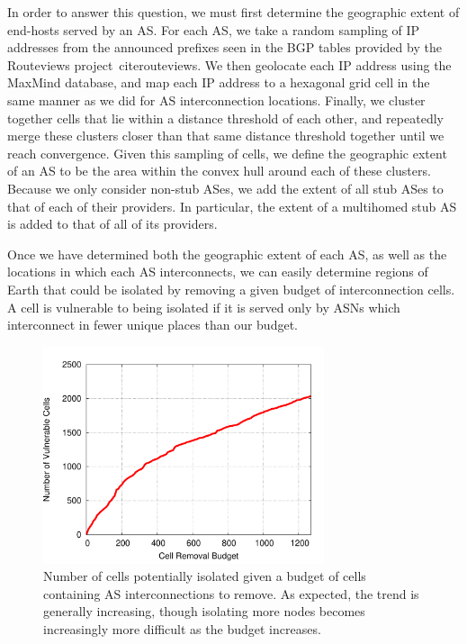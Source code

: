     In order to answer this question, we must first determine the geographic extent of end-hosts served by an AS.
    For each AS, we take a random sampling of IP addresses from the announced prefixes seen in the BGP tables provided by the Routeviews project~cite{routeviews}. 
    We then geolocate each IP address using the MaxMind database, and map each IP address to a hexagonal grid cell in the same manner as we did for AS interconnection locations.
    Finally, we cluster together cells that lie within a distance threshold of each other, and repeatedly merge these clusters closer than that same distance threshold together until we reach convergence.
    Given this sampling of cells, we define the geographic extent of an AS to be the area within the convex hull around each of these clusters. 
    Because we only consider non-stub ASes, we add the extent of all stub ASes to that of each of their providers.
    In particular, the extent of a multihomed stub AS is added to that of all of its providers.

    Once we have determined both the geographic extent of each AS, as well as the locations in which each AS interconnects, we can easily determine regions of Earth that could be isolated by removing a given budget of interconnection cells.
    A cell is vulnerable to being isolated if it is served only by ASNs which interconnect in fewer unique places than our budget.

    \begin{figure}[tb]
\centering
\includegraphics[width=3.25in]{isolation}
\caption[]{\label{fig:isolation} Number of cells potentially isolated given a budget of cells containing AS interconnections to remove. As expected, the trend is generally increasing, though isolating more nodes becomes increasingly more difficult as the budget increases.} 
\end{figure}

